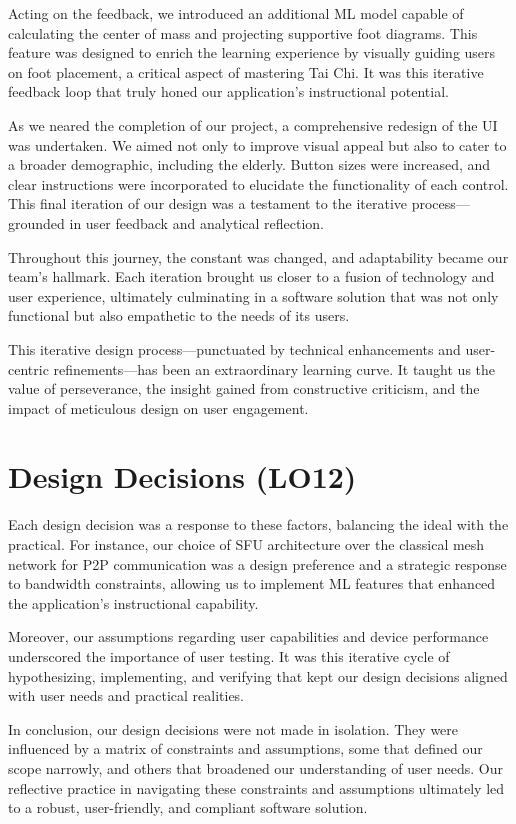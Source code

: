 \documentclass{article}
\begin{document}
Acting on the feedback, we introduced an additional ML model capable of calculating the center of mass and projecting supportive foot diagrams. 
This feature was designed to enrich the learning experience by visually guiding users on foot placement, a critical aspect of mastering Tai Chi. 
It was this iterative feedback loop that truly honed our application's instructional potential.

As we neared the completion of our project, a comprehensive redesign of the UI was undertaken. 
We aimed not only to improve visual appeal but also to cater to a broader demographic, including the elderly. 
Button sizes were increased, and clear instructions were incorporated to elucidate the functionality of each control. 
This final iteration of our design was a testament to the iterative process—grounded in user feedback and analytical reflection.

Throughout this journey, the constant was changed, and adaptability became our team's hallmark. 
Each iteration brought us closer to a fusion of technology and user experience, ultimately culminating in a software solution that was not only functional but also empathetic to the needs of its users.

This iterative design process—punctuated by technical enhancements and user-centric refinements—has been an extraordinary learning curve. 
It taught us the value of perseverance, the insight gained from constructive criticism, and the impact of meticulous design on user engagement.

\section{Design Decisions (LO12)}
Each design decision was a response to these factors, balancing the ideal with the practical. 
For instance, our choice of SFU architecture over the classical mesh network for P2P communication was a design preference and a strategic response to bandwidth constraints, allowing us to implement ML features that enhanced the application's instructional capability.

Moreover, our assumptions regarding user capabilities and device performance underscored the importance of user testing. 
It was this iterative cycle of hypothesizing, implementing, and verifying that kept our design decisions aligned with user needs and practical realities.

In conclusion, our design decisions were not made in isolation. They were influenced by a matrix of constraints and assumptions, some that defined our scope narrowly, and others that broadened our understanding of user needs. 
Our reflective practice in navigating these constraints and assumptions ultimately led to a robust, user-friendly, and compliant software solution.
\end{document}
